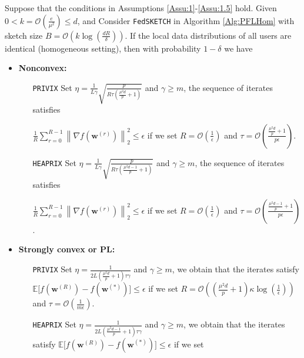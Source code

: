 \documentclass[review,onefignum,onetabnum]{siamart190516}
\begin{document}
\begin{theorem}\label{thm:homog_case}
  Suppose that the conditions in Assumptions \ref{Assu:1}-\ref{Assu:1.5} hold. Given $0<k=\mathcal{O}\left(\frac{e}{\mu^2}\right)\leq d$, and Consider \texttt{FedSKETCH} in Algorithm \ref{Alg:PFLHom} with sketch size $B=\mathcal{O}\left(k\log\left(\frac{d R}{\delta}\right)\right)$. If the local data distributions of all users are identical (homogeneous setting), then with probability $1-\delta$ we have  
 \begin{itemize}
     \item \textbf{Nonconvex:}  
     \begin{itemize}
         \item [\texttt{PRIVIX}] Set $\eta=\frac{1}{L\gamma}\sqrt{\frac{p}{R\tau\left(\frac{\mu^2d}{p}+1\right)}}$ and $\gamma\geq m$, the sequence of iterates satisfies 
         
          $\frac{1}{R}\sum_{r=0}^{R-1}\left\|\nabla f({\boldsymbol{w}}^{(r)})\right\|_2^2\leq {\epsilon}$ if we set
     $R=\mathcal{O}\left(\frac{1}{\epsilon}\right)$ and $ \tau=\mathcal{O}\left(\frac{\frac{\mu^2d}{p}+1}{{p}\epsilon}\right)$.
         \item [\texttt{HEAPRIX}] Set 
$\eta=\frac{1}{L\gamma}\sqrt{\frac{p}{R\tau\left(\frac{\mu^2d-1}{p}+1\right)}}$ and $\gamma\geq m$, the sequence of iterates satisfies  

$\frac{1}{R}\sum_{r=0}^{R-1}\left\|\nabla f({\boldsymbol{w}}^{(r)})\right\|_2^2\leq {\epsilon}$ if we set
     $R=\mathcal{O}\left(\frac{1}{\epsilon}\right)$ and $ \tau=\mathcal{O}\left(\frac{\frac{\mu^2d-1}{p}+1}{{p}\epsilon}\right)$. 
     \end{itemize}
     
     \item \textbf{Strongly convex or PL:}
      \begin{itemize}
         \item [\texttt{PRIVIX}] Set $\eta=\frac{1}{2L\left(\frac{\mu^2d}{p}+1\right)\tau\gamma}$ and $\gamma\geq m$, we obtain that the iterates satisfy $\mathbb{E}\Big[f({\boldsymbol{w}}^{(R)})-f({\boldsymbol{w}}^{(*)})\Big]\leq \epsilon$ if  we set
     $R=\mathcal{O}\left(\left(\frac{\mu^2d}{p}+1\right)\kappa\log\left(\frac{1}{\epsilon}\right)\right)$ and $ \tau=\mathcal{O}\left(\frac{1}{m\epsilon}\right)$.
          
         \item [\texttt{HEAPRIX}] Set $\eta=\frac{1}{2L\left(\frac{\mu^2d-1}{p}+1\right)\tau\gamma}$ and $\gamma\geq m$, we obtain that the iterates satisfy $\mathbb{E}\Big[f({\boldsymbol{w}}^{(R)})-f({\boldsymbol{w}}^{(*)})\Big]\leq \epsilon$ if  we set


\end{itemize}
\end{itemize}
\end{theorem}
\end{document}
